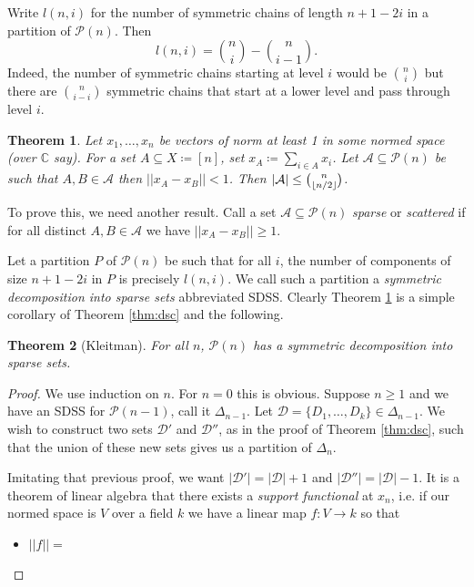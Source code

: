 \documentclass{report}
\DeclarePairedDelimiter\floor{\lfloor}{\rfloor}
\theoremstyle{definition}
\theoremstyle{plain}
\newtheorem{thm}{Theorem}[section]
\theoremstyle{definition}
\begin{document}
 	Write $l(n,i)$ for the number of symmetric chains of length $n+1-2i$ in a partition of $\mathcal{P}(n)$. Then
 	\[
 		l(n,i) = \binom{n}{i} - \binom{n}{i-1}.
 	\]
 	Indeed, the number of symmetric chains starting at level $i$ would be $\binom{n}{i}$ but there are $\binom{n}{i-i}$ symmetric chains that start at a lower level and pass through level $i$.
 	\begin{thm}\label{thm:norm_scat}
 		Let $x_1,\ldots,x_n$ be vectors of norm at least 1 in some normed space (over $\mathbb{C}$ say). For a set $A\subseteq X \coloneqq [n]$, set $x_A \coloneqq \sum_{i\in A}x_i$. Let $\mathcal{A}\subseteq \mathcal{P}(n)$ be such that $A,B\in\mathcal{A}$ then $||x_A-x_B||<1$. Then $|\mathcal{A}| \leq \binom{n}{\floor{n/2}}$.
 	\end{thm}
 	To prove this, we need another result. Call a set $\mathcal{A}\subseteq \mathcal{P}(n)$ \emph{sparse} or \emph{scattered} if for all distinct $A,B\in\mathcal{A}$  we have $||x_A-x_B|| \geq 1$. 
 	
 	Let a partition $P$ of $\mathcal{P}(n)$ be such that for all $i$, the number of components of size $n+1-2i$ in $P$ is precisely $l(n,i)$. We call such a partition a \emph{symmetric decomposition into sparse sets} abbreviated SDSS. Clearly Theorem \ref{thm:norm_scat} is a simple corollary of Theorem \ref{thm:dsc} and the following.
 	\begin{thm}[Kleitman]
 		For all $n$, $\mathcal{P}(n)$ has a symmetric decomposition into sparse sets. 
 	\end{thm}
 	\begin{proof}
 		We use induction on $n$. For $n=0$ this is obvious. Suppose $n\geq 1$ and we have an SDSS for $\mathcal{P}(n-1)$, call it $\Delta_{n-1}$. Let $\mathcal{D} = \{D_1,\ldots,D_k\}\in\Delta_{n-1}$. We wish to construct two sets $\mathcal{D}'$ and $\mathcal{D}''$, as in the proof of Theorem \ref{thm:dsc}, such that the union of these new sets gives us a partition of $\Delta_n$.
 		
 		Imitating that previous proof, we want $|\mathcal{D}'| = |\mathcal{D}| + 1$ and $|\mathcal{D}''| = |\mathcal{D}| -1$. It is a theorem of linear algebra that there exists a \emph{support functional} at $x_n$, i.e. if our normed space is $V$ over a field $k$ we have a linear map $f\colon V \to k$ so that 
 		\begin{itemize}
 			\item $||f||=$
 		\end{itemize}
 	\end{proof}
\end{document}
